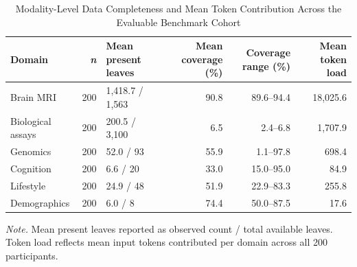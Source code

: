 \documentclass[11pt,a4paper,twoside]{article}
\begin{document}
\begin{table}[H]
\caption{Modality-Level Data Completeness and Mean Token Contribution Across the Evaluable Benchmark Cohort}
\label{tab:s10}
\small
\begin{tabularx}{\linewidth}{X r X r r r}
\toprule
Domain & \textit{n} & Mean present leaves & Mean coverage (\%) & Coverage range (\%) & Mean token load \\
\midrule
Brain MRI & 200 & 1,418.7 / 1,563 & 90.8 & 89.6--94.4 & 18,025.6 \\
Biological assays & 200 & 200.5 / 3,100 & 6.5 & 2.4--6.8 & 1,707.9 \\
Genomics & 200 & 52.0 / 93 & 55.9 & 1.1--97.8 & 698.4 \\
Cognition & 200 & 6.6 / 20 & 33.0 & 15.0--95.0 & 84.9 \\
Lifestyle & 200 & 24.9 / 48 & 51.9 & 22.9--83.3 & 255.8 \\
Demographics & 200 & 6.0 / 8 & 74.4 & 50.0--87.5 & 17.6 \\
\bottomrule
\end{tabularx}
\par\smallskip\noindent\small\textit{Note.} Mean present leaves reported as observed count / total available leaves. Token load reflects mean input tokens contributed per domain across all 200 participants.
\end{table}
\end{document}

